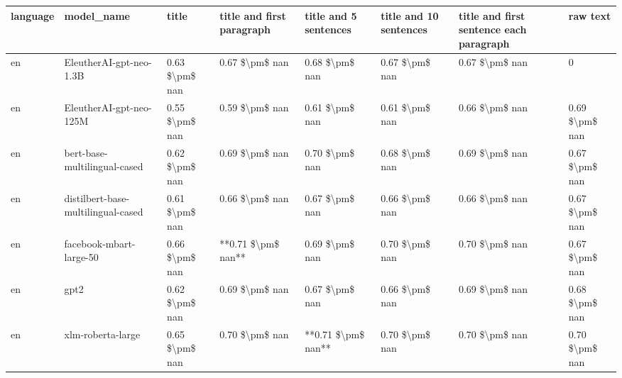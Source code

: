 \begin{tabular}{llllllll}
\toprule
language &                         model\_name &          title & title and first paragraph & title and 5 sentences & title and 10 sentences & title and first sentence each paragraph &           raw text \\
\midrule
      en &            EleutherAI-gpt-neo-1.3B & 0.63 \$\textbackslash pm\$ nan &            0.67 \$\textbackslash pm\$ nan &        0.68 \$\textbackslash pm\$ nan &         0.67 \$\textbackslash pm\$ nan &                          0.67 \$\textbackslash pm\$ nan &                  0 \\
      en &            EleutherAI-gpt-neo-125M & 0.55 \$\textbackslash pm\$ nan &            0.59 \$\textbackslash pm\$ nan &        0.61 \$\textbackslash pm\$ nan &         0.61 \$\textbackslash pm\$ nan &                          0.66 \$\textbackslash pm\$ nan &     0.69 \$\textbackslash pm\$ nan \\
      en &       bert-base-multilingual-cased & 0.62 \$\textbackslash pm\$ nan &            0.69 \$\textbackslash pm\$ nan &        0.70 \$\textbackslash pm\$ nan &         0.68 \$\textbackslash pm\$ nan &                          0.69 \$\textbackslash pm\$ nan &     0.67 \$\textbackslash pm\$ nan \\
      en & distilbert-base-multilingual-cased & 0.61 \$\textbackslash pm\$ nan &            0.66 \$\textbackslash pm\$ nan &        0.67 \$\textbackslash pm\$ nan &         0.66 \$\textbackslash pm\$ nan &                          0.66 \$\textbackslash pm\$ nan &     0.67 \$\textbackslash pm\$ nan \\
      en &            facebook-mbart-large-50 & 0.66 \$\textbackslash pm\$ nan &        **0.71 \$\textbackslash pm\$ nan** &        0.69 \$\textbackslash pm\$ nan &         0.70 \$\textbackslash pm\$ nan &                          0.70 \$\textbackslash pm\$ nan &     0.67 \$\textbackslash pm\$ nan \\
      en &                               gpt2 & 0.62 \$\textbackslash pm\$ nan &            0.69 \$\textbackslash pm\$ nan &        0.67 \$\textbackslash pm\$ nan &         0.66 \$\textbackslash pm\$ nan &                          0.69 \$\textbackslash pm\$ nan &     0.68 \$\textbackslash pm\$ nan \\
      en &                  xlm-roberta-large & 0.65 \$\textbackslash pm\$ nan &            0.70 \$\textbackslash pm\$ nan &    **0.71 \$\textbackslash pm\$ nan** &         0.70 \$\textbackslash pm\$ nan &                          0.70 \$\textbackslash pm\$ nan &     0.70 \$\textbackslash pm\$ nan \\

\end{tabular}
